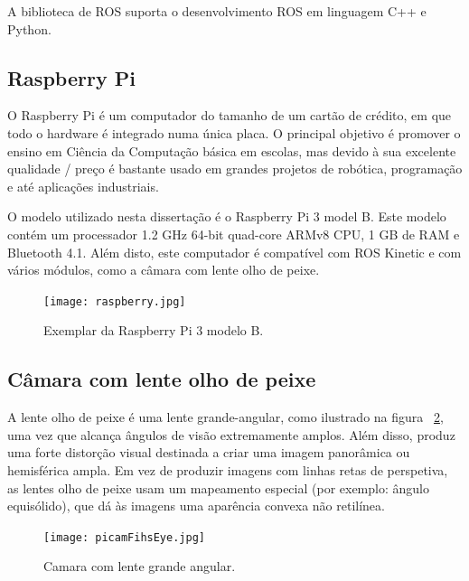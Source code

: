 A biblioteca de ROS suporta o desenvolvimento ROS em linguagem C++ e Python.


\subsection{Raspberry Pi}

O Raspberry Pi é um computador do tamanho de um cartão de crédito, em que todo o hardware é integrado numa única placa. O principal objetivo é promover o ensino em Ciência da Computação básica em escolas, mas devido à sua excelente qualidade / preço é bastante usado em grandes projetos de robótica, programação e até aplicações industriais. 

O modelo utilizado nesta dissertação é o Raspberry Pi 3 model B. Este modelo contém um processador 1.2 GHz 64-bit quad-core ARMv8 CPU, 1 GB de RAM e Bluetooth 4.1. Além disto, este computador é compatível com ROS Kinetic e com vários módulos, como a câmara com lente olho de peixe.

\begin{figure}[h!] %
	\begin{center}
		\leavevmode		
		\texttt{[image: raspberry.jpg]}
		\caption{Exemplar da Raspberry Pi 3 modelo B.}
		\label{fig:raspberry}
	\end{center}
\end{figure}


\pagebreak
\subsection{Câmara com lente olho de peixe}

A lente olho de peixe é uma lente grande-angular, como ilustrado na figura ~\ref{fig:picamFishEye}, uma vez que alcança ângulos de visão extremamente amplos. Além disso, produz uma forte distorção visual destinada a criar uma imagem panorâmica ou hemisférica ampla.  Em vez de produzir imagens com linhas retas de perspetiva, as lentes olho de peixe usam um mapeamento especial (por exemplo: ângulo equisólido), que dá às imagens uma aparência convexa não retilínea.


\begin{figure}[h!]
	\begin{center}
		\leavevmode		
		\texttt{[image: picamFihsEye.jpg]}
		\caption{Camara com lente grande angular.}
		\label{fig:picamFishEye}
	\end{center}
\end{figure}

